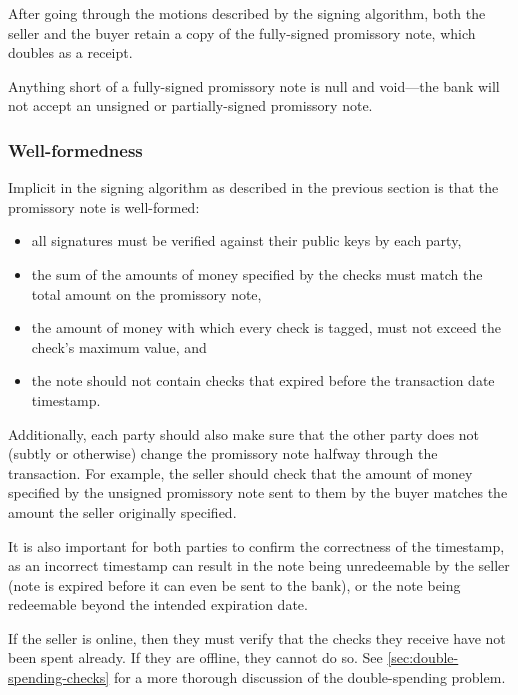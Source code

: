 \documentclass[12pt,a4paper]{article}
\begin{document}
	\newpage
	\begin{multicols}{2}

	After going through the motions described by the signing algorithm, both the seller and the buyer retain a copy of the fully-signed promissory note, which doubles as a receipt.
	
	Anything short of a fully-signed promissory note is null and void---the bank will not accept an unsigned or partially-signed promissory note.
	
	\subsubsection{Well-formedness}

	Implicit in the signing algorithm as described in the previous section is that the promissory note is well-formed:
	
	\begin{itemize}
		\item all signatures must be verified against their public keys by each party,
		\item the sum of the amounts of money specified by the checks must match the total amount on the promissory note,
		\item the amount of money with which every check is tagged, must not exceed the check's maximum value, and
		\item the note should not contain checks that expired before the transaction date timestamp.
	\end{itemize}

	Additionally, each party should also make sure that the other party does not (subtly or otherwise) change the promissory note halfway through the transaction. For example, the seller should check that the amount of money specified by the unsigned promissory note sent to them by the buyer matches the amount the seller originally specified.
	
	It is also important for both parties to confirm the correctness of the timestamp, as an incorrect timestamp can result in the note being unredeemable by the seller (note is expired before it can even be sent to the bank), or the note being redeemable beyond the intended expiration date.
	
	If the seller is online, then they must verify that the checks they receive have not been spent already. If they are offline, they cannot do so. See \autoref{sec:double-spending-checks} for a more thorough discussion of the double-spending problem.


\end{multicols}
\end{document}
